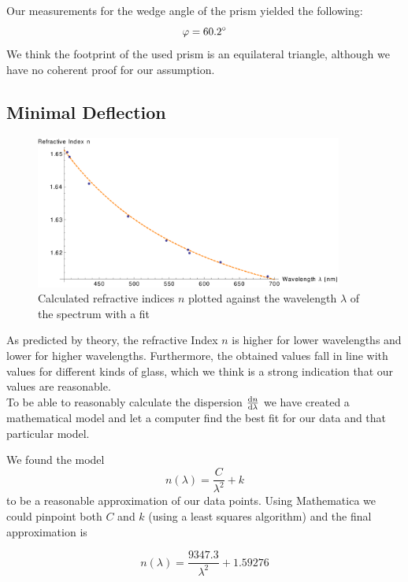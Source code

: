 \documentclass{scrreprt}
\renewcommand{\phi}{\varphi}
\begin{document}
Our measurements for the wedge angle of the prism yielded the following:
\begin{equation}
	\phi = \ang{60.2}
\notag
\end{equation}
We think the footprint of the used prism is an equilateral triangle, although we have no coherent proof for our assumption.

\subsection{Minimal Deflection}
\begin{figure}[H]
	\centering
  \includegraphics[width=0.9\textwidth]{diag/meas_and_fit.pdf}
	\caption{Calculated refractive indices $n$ plotted against the wavelength $\lambda$ of the spectrum with a fit}
	\label{fig:meas_and_fit}
\end{figure}
As predicted by theory, the refractive Index $n$ is higher for lower wavelengths and lower for higher wavelengths. Furthermore, the obtained values fall in line with values for different kinds of glass, which we think is a strong indication that our values are reasonable.\\

To be able to reasonably calculate the dispersion $\frac{\dif n}{\dif \lambda}$ we have created a mathematical model and let a computer find the best fit for our data and that particular model.

We found the model 
\begin{equation}
n (\lambda) = \frac{C}{\lambda^2}+k
\end{equation}
to be a reasonable approximation of our data points. Using Mathematica we could pinpoint both $C$ and $k$ (using a least squares algorithm) and the final approximation is

\begin{equation}\label{eq:approx}
n (\lambda) = \frac{9347.3}{\lambda^2}+1.59276
\end{equation} 
\end{document}
